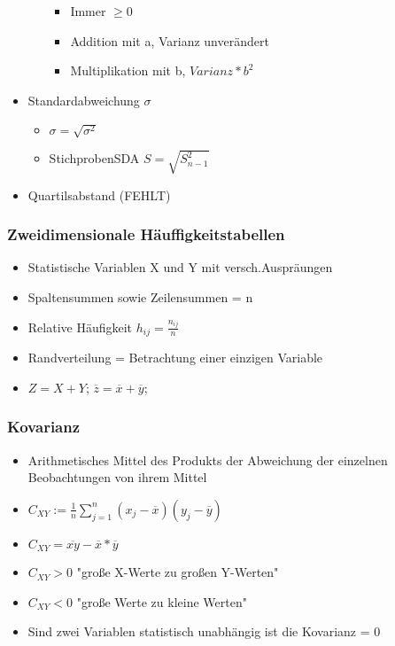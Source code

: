 \documentclass[a4paper]{article}
\begin{document}
\begin{landscape}
\begin{multicols}{4}
\begin{itemize}[noitemsep,nolistsep,leftmargin=*]
\begin{itemize}[noitemsep,nolistsep,leftmargin=*]
\begin{itemize}[noitemsep,nolistsep,leftmargin=*]
                    \item Immer $ \geq 0$
                    \item Addition mit a, Varianz unverändert
                    \item Multiplikation mit b, $Varianz * b^2$
                \end{itemize}
        \end{itemize}
        \item Standardabweichung $\sigma$
        \begin{itemize}[noitemsep,nolistsep,leftmargin=*]
            \item $\sigma = \sqrt{\sigma^2}$
            \item StichprobenSDA $S = \sqrt{S^2_{n-1}}$
        \end{itemize}
        \item Quartilsabstand (FEHLT)
    \end{itemize}

    \subsubsection*{Zweidimensionale Häuffigkeitstabellen}
    \begin{itemize}[noitemsep,nolistsep,leftmargin=*]
        \item Statistische Variablen X und Y mit versch.Auspräungen
        \item Spaltensummen sowie Zeilensummen = n
        \item Relative Häufigkeit $h_{ij} = \frac{n_{ij}}{n}$
        \item Randverteilung = Betrachtung einer einzigen Variable
        \item $ Z = X +Y$; $\overline{z} = \overline{x} + \overline{y}$; 
    \end{itemize}

    \subsubsection*{Kovarianz}
    \begin{itemize}[noitemsep,nolistsep,leftmargin=*]
        \item Arithmetisches Mittel des Produkts der Abweichung der einzelnen Beobachtungen von ihrem Mittel
        \item $C_{XY} := \frac{1}{n}\sum_{j = 1}^{n}{(x_j - \overline{x})(y_j - \overline{y})}$ 
        \item $C_{XY} = \overline{xy} - \overline{x}*\overline{y}$
        \item  $C_{XY} > 0$ "große X-Werte zu großen Y-Werten"
        \item $C_{XY} < 0$ "große Werte zu kleine Werten"
        \item Sind zwei Variablen statistisch unabhängig ist die Kovarianz = 0
    \end{itemize}


\end{multicols}
\end{landscape}
\end{document}
